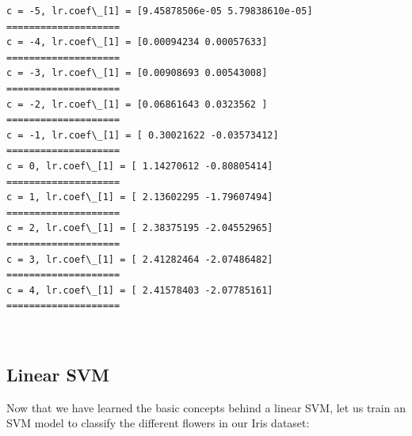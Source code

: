 \documentclass[11pt]{article}
\begin{document}
    \begin{Verbatim}[commandchars=\\\{\}]
c = -5, lr.coef\_[1] = [9.45878506e-05 5.79838610e-05]
====================
c = -4, lr.coef\_[1] = [0.00094234 0.00057633]
====================
c = -3, lr.coef\_[1] = [0.00908693 0.00543008]
====================
c = -2, lr.coef\_[1] = [0.06861643 0.0323562 ]
====================
c = -1, lr.coef\_[1] = [ 0.30021622 -0.03573412]
====================
c = 0, lr.coef\_[1] = [ 1.14270612 -0.80805414]
====================
c = 1, lr.coef\_[1] = [ 2.13602295 -1.79607494]
====================
c = 2, lr.coef\_[1] = [ 2.38375195 -2.04552965]
====================
c = 3, lr.coef\_[1] = [ 2.41282464 -2.07486482]
====================
c = 4, lr.coef\_[1] = [ 2.41578403 -2.07785161]
====================

    \end{Verbatim}

    \begin{center}
    \end{center}
    { \hspace*{\fill} \\}
    
    \subsection{Linear SVM}\label{linear-svm}

Now that we have learned the basic concepts behind a linear SVM, let us
train an SVM model to classify the different flowers in our Iris
dataset:
\end{document}
